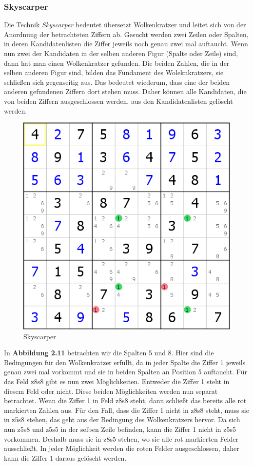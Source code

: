 \newpage
\subsubsection{Skyscarper}
\label{Skyscarper}
Die Technik \textit{Skyscarper} bedeutet übersetzt Wolkenkratzer und leitet sich von der Anordnung der betrachteten Ziffern ab. Gesucht werden zwei Zeilen oder Spalten, in deren Kandidatenlisten die Ziffer jeweils noch genau zwei mal auftaucht. Wenn nun zwei der Kandidaten in der selben anderen Figur (Spalte oder Zeile) sind, dann hat man einen Wolkenkratzer gefunden. Die beiden Zahlen, die in der selben anderen Figur sind, bilden das Fundament des Woleknkratzers, sie schließen sich gegenseitig aus. Das bedeutet wiederum, dass eine der beiden anderen gefundenen Ziffern dort stehen muss. Daher können alle Kandidaten, die von beiden Ziffern ausgeschlossen werden, aus den Kandidatenlisten gelöscht werden.	

\begin{figure}[h]
\begin{center}
\includegraphics{./img/skyscarper.png}
\caption{Skyscarper}
\end{center}
\end{figure}

\noindent In \textbf{Abbildung 2.11} betrachten wir die Spalten 5 und 8. Hier sind die Bedingungen für den Wolkenkratzer erfüllt, da in jeder Spalte die Ziffer 1 jeweils genau zwei mal vorkommt und sie in beiden Spalten an Position 5 auftaucht. Für das Feld z8s8 gibt es nun zwei Möglichkeiten. Entweder die Ziffer 1 steht in diesem Feld oder nicht. Diese beiden Möglichkeiten werden nun separat betrachtet. Wenn die Ziffer 1 in Feld z8s8 steht, dann schließt das bereits alle rot markierten Zahlen aus. Für den Fall, dass die Ziffer 1 nicht in z8s8 steht, muss sie in z5s8 stehen, das geht aus der Bedingung des Wolkenkratzers hervor. Da sich nun z5s8 und z5s5 in der selben Zeile befinden, kann die Ziffer 1 nicht in z5s5 vorkommen. Deshalb muss sie in z8s5 stehen, wo sie alle rot markierten Felder ausschließt. In jeder Möglichkeit werden die roten Felder ausgeschlossen, daher kann die Ziffer 1 daraus gelöscht werden.